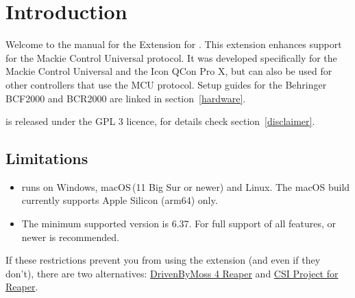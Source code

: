 \section{Introduction}

Welcome to the manual for the \mcu Extension for \reaper. This
extension enhances support for the Mackie Control Universal protocol.
It was developed specifically for the Mackie Control Universal and the Icon QCon
Pro X, but can also be used for other controllers that use the MCU
protocol. Setup guides for the Behringer BCF2000 and BCR2000 are linked
in section~\ref{hardware}.

\mcu is released under the GPL 3 licence, for details check
section~\ref{disclaimer}.

\subsection{Limitations}
\begin{itemize}
\item \mcu runs on Windows, macOS\,(11 Big Sur or newer) and Linux.
  The macOS build currently supports Apple Silicon (arm64) only. 

\item The minimum supported \reaper version is 6.37. For full support
  of all features,  or newer is recommended.
  \end{itemize}

If these restrictions prevent you from using the extension (and even
if they don't), there are two alternatives:
\href{http://www.mossgrabers.de/Software/Reaper/Reaper.html}{DrivenByMoss
  4 Reaper} and
\href{https://github.com/GeoffAWaddington/CSI_Install}{CSI Project for
  Reaper}.

